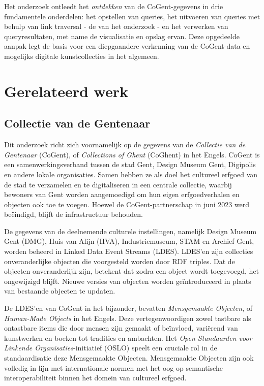 \documentclass[conference]{IEEEtran}
\begin{document}
Het onderzoek ontleedt het \textit{ontdekken} van de CoGent-gegevens in drie fundamentele onderdelen: het opstellen van queries, het uitvoeren van queries met behulp van link traversal - de van het onderzoek - en het verwerken van queryresultaten, met name de visualisatie en opslag ervan. Deze opgedeelde aanpak legt de basis voor een diepgaandere verkenning van de CoGent-data en mogelijks digitale kunstcollecties in het algemeen.

\section{Gerelateerd werk}

\subsection{Collectie van de Gentenaar}
Dit onderzoek richt zich voornamelijk op de gegevens van de \textit{Collectie van de Gentenaar} (CoGent), of \textit{Collections of Ghent} (CoGhent) in het Engels. CoGent is een samenwerkingsverband tussen de stad Gent, Design Museum Gent, Digipolis en andere lokale organisaties. Samen hebben ze als doel het cultureel erfgoed van de stad te verzamelen en te digitaliseren in een centrale collectie, waarbij bewoners van Gent worden aangemoedigd om hun eigen erfgoedverhalen en objecten ook toe te voegen. Hoewel de CoGent-partnerschap in juni 2023 werd beëindigd, blijft de infrastructuur behouden. \cite{leemputten2022gent} \cite{schouppe2022gent}

De gegevens van de deelnemende culturele instellingen, namelijk Design Museum Gent (DMG), Huis van Alijn (HVA), Industriemuseum, STAM en Archief Gent, worden beheerd in Linked Data Event Streams (LDES). LDES'en zijn collecties onveranderlijke objecten die voorgesteld worden door RDF triples. Dat de objecten onveranderlijk zijn, betekent dat zodra een object wordt toegevoegd, het ongewijzigd blijft. Nieuwe versies van objecten worden geïntroduceerd in plaats van bestaande objecten te updaten. \cite{floreverk2022coghent} \cite{colpaert2023ldes}

De LDES'en van CoGent in het bijzonder, bevatten \textit{Mensgemaakte Objecten}, of \textit{Human-Made Objects} in het Engels. Deze vertegenwoordigen zowel tastbare als ontastbare items die door mensen zijn gemaakt of beïnvloed, variërend van kunstwerken en boeken tot tradities en ambachten. Het \textit{Open Standaarden voor Linkende Organisaties}-initiatief (OSLO) speelt een cruciale rol in de standaardisatie deze Mensgemaakte Objecten. Mensgemaakte Objecten zijn ook volledig in lijn met internationale normen met het oog op semantische interoperabiliteit binnen het domein van cultureel erfgoed. \cite{van2022publishing} \cite{vanderperren2021oslo}
\end{document}

